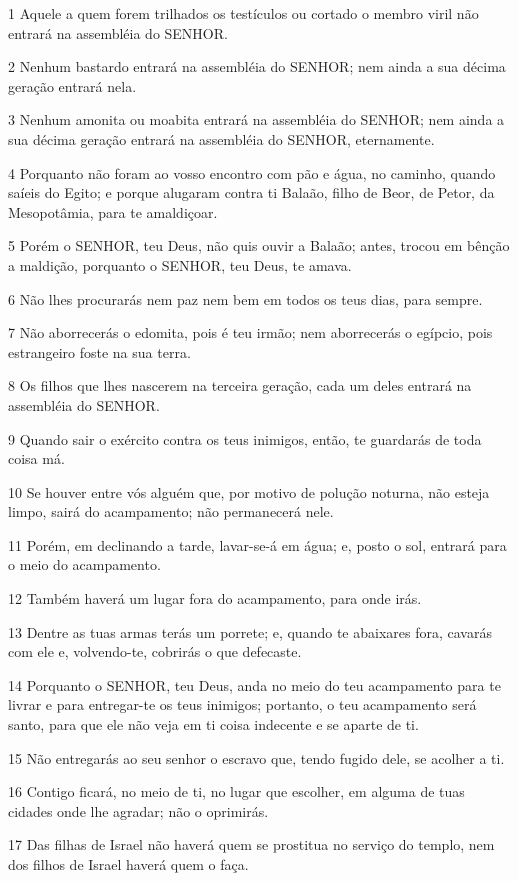 \par 1 Aquele a quem forem trilhados os testículos ou cortado o membro viril não entrará na assembléia do SENHOR.
\par 2 Nenhum bastardo entrará na assembléia do SENHOR; nem ainda a sua décima geração entrará nela.
\par 3 Nenhum amonita ou moabita entrará na assembléia do SENHOR; nem ainda a sua décima geração entrará na assembléia do SENHOR, eternamente.
\par 4 Porquanto não foram ao vosso encontro com pão e água, no caminho, quando saíeis do Egito; e porque alugaram contra ti Balaão, filho de Beor, de Petor, da Mesopotâmia, para te amaldiçoar.
\par 5 Porém o SENHOR, teu Deus, não quis ouvir a Balaão; antes, trocou em bênção a maldição, porquanto o SENHOR, teu Deus, te amava.
\par 6 Não lhes procurarás nem paz nem bem em todos os teus dias, para sempre.
\par 7 Não aborrecerás o edomita, pois é teu irmão; nem aborrecerás o egípcio, pois estrangeiro foste na sua terra.
\par 8 Os filhos que lhes nascerem na terceira geração, cada um deles entrará na assembléia do SENHOR.
\par 9 Quando sair o exército contra os teus inimigos, então, te guardarás de toda coisa má.
\par 10 Se houver entre vós alguém que, por motivo de polução noturna, não esteja limpo, sairá do acampamento; não permanecerá nele.
\par 11 Porém, em declinando a tarde, lavar-se-á em água; e, posto o sol, entrará para o meio do acampamento.
\par 12 Também haverá um lugar fora do acampamento, para onde irás.
\par 13 Dentre as tuas armas terás um porrete; e, quando te abaixares fora, cavarás com ele e, volvendo-te, cobrirás o que defecaste.
\par 14 Porquanto o SENHOR, teu Deus, anda no meio do teu acampamento para te livrar e para entregar-te os teus inimigos; portanto, o teu acampamento será santo, para que ele não veja em ti coisa indecente e se aparte de ti.
\par 15 Não entregarás ao seu senhor o escravo que, tendo fugido dele, se acolher a ti.
\par 16 Contigo ficará, no meio de ti, no lugar que escolher, em alguma de tuas cidades onde lhe agradar; não o oprimirás.
\par 17 Das filhas de Israel não haverá quem se prostitua no serviço do templo, nem dos filhos de Israel haverá quem o faça.
